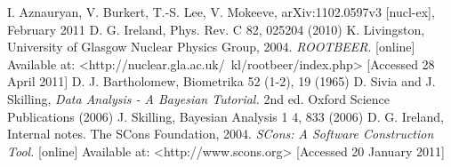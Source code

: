 \documentclass[a4paper,12pt]{article}
\begin{document}
\begin{thebibliography}{99}
 I. Aznauryan, V. Burkert, T.-S. Lee, V. Mokeeve, arXiv:1102.0597v3 [nucl-ex], February 2011
 D. G. Ireland, Phys. Rev. C 82, 025204 (2010)
 K. Livingston, University of Glasgow Nuclear Physics Group, 2004. \textit{ROOTBEER}. [online] Available at: <http://nuclear.gla.ac.uk/~kl/rootbeer/index.php> [Accessed 28 April 2011]
 D. J. Bartholomew, Biometrika 52 (1-2), 19 (1965)
 D. Sivia and J. Skilling, \textit{Data Analysis - A Bayesian Tutorial.} 2nd ed. Oxford Science Publications (2006)
 J. Skilling, Bayesian Analysis 1 4, 833 (2006)
 D. G. Ireland, Internal notes.
 The SCons Foundation, 2004. \textit{SCons: A Software Construction Tool.} [online] Available at: <http://www.scons.org> [Accessed 20 January 2011]
\end{thebibliography}
\end{document}
